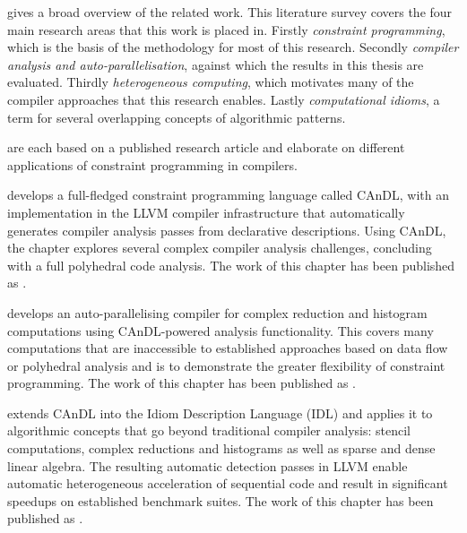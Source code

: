     {\bf{}} gives a broad overview of the related work.
    This literature survey covers the four main research areas that this work
    is placed in.
    Firstly {\em constraint programming}, which is the basis of the methodology
    for most of this research.
    Secondly {\em compiler analysis and auto-parallelisation}, against which the
    results in this thesis are evaluated.
    Thirdly {\em heterogeneous computing}, which motivates many of the compiler
    approaches that this research enables.
    Lastly {\em computational idioms}, a term for several overlapping concepts
    of algorithmic patterns.

    {\bf{}}
    are each based on a published research article and elaborate on different
    applications of constraint programming in compilers.

    {\bf{}} develops a full-fledged constraint programming
    language called CAnDL, with an implementation in the LLVM compiler
    infrastructure that automatically generates compiler analysis passes from
    declarative descriptions.
    Using CAnDL, the chapter explores several complex compiler analysis
    challenges, concluding with a full polyhedral code analysis.
    The work of this chapter has been published as
    {\bf\citet{Ginsbach:2018:CDS:3178372.3179515}}.

    {\bf{}} develops an auto-parallelising compiler for
    complex reduction and histogram computations using CAnDL-powered analysis
    functionality.
    This covers many computations that are inaccessible to established
    approaches based on data flow or polyhedral analysis and is to demonstrate
    the greater flexibility of constraint programming.
    The work of this chapter has been published as
    {\bf\citet{ginsbach2017discovery}}.

    {\bf{}} extends CAnDL into the Idiom Description Language
    (IDL) and applies it to algorithmic concepts that go beyond traditional
    compiler analysis: stencil computations, complex reductions and histograms
    as well as sparse and dense linear algebra.
    The resulting automatic detection passes in LLVM enable automatic
    heterogeneous acceleration of sequential code and result in significant
    speedups on established benchmark suites.
    The work of this chapter has been published as
    {\bf\citet{Ginsbach:2018:AML:3173162.3173182}}.
